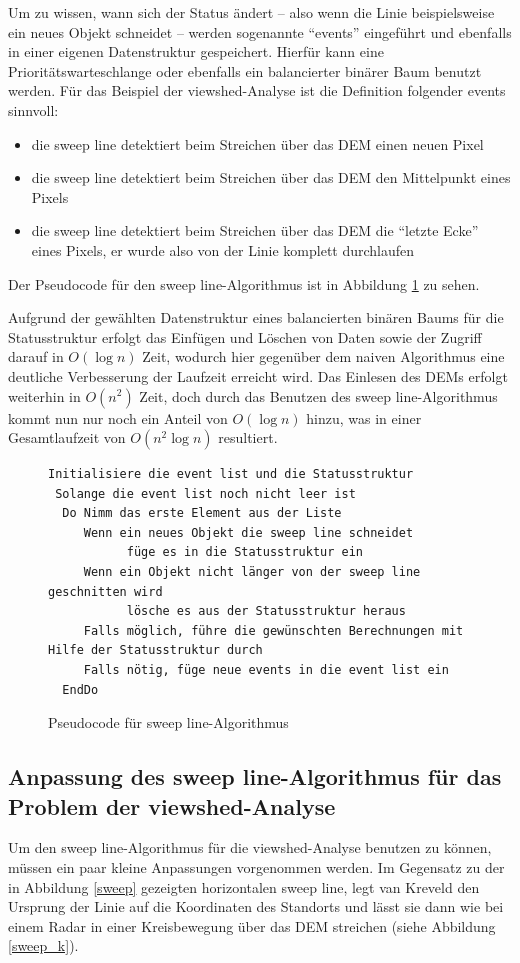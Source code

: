 Um zu wissen, wann sich der Status ändert -- also wenn die Linie beispielsweise ein neues Objekt schneidet -- werden sogenannte ``events'' eingeführt
und ebenfalls in einer eigenen Datenstruktur gespeichert. Hierfür kann eine Prioritätswarteschlange oder ebenfalls ein balancierter binärer Baum 
benutzt werden. Für das Beispiel der viewshed-Analyse ist die Definition folgender events sinnvoll: 
\begin{itemize}
 \item die sweep line detektiert beim Streichen über das DEM einen neuen Pixel
 \item die sweep line detektiert beim Streichen über das DEM den Mittelpunkt eines Pixels
 \item die sweep line detektiert beim Streichen über das DEM die ``letzte Ecke'' eines Pixels, er wurde also von der Linie komplett durchlaufen
\end{itemize}

Der Pseudocode für den sweep line-Algorithmus ist in Abbildung \ref{pseudo} zu sehen.
\vspace{5pt}

Aufgrund der gewählten Datenstruktur eines balancierten binären Baums für die Statusstruktur erfolgt das Einfügen und Löschen von Daten sowie der 
Zugriff darauf in $O(\log n)$ Zeit, wodurch hier gegenüber dem naiven Algorithmus eine deutliche Verbesserung der Laufzeit erreicht wird. Das 
Einlesen des DEMs erfolgt weiterhin in $O(n^2)$ Zeit, doch durch das Benutzen des sweep line-Algorithmus kommt nun nur noch ein Anteil von 
$O(\log n)$ hinzu, was in einer Gesamtlaufzeit von $O(n^2\log n)$ resultiert.

\begin{figure}[!ht]
 \centering
 \begin{BVerbatim}
Initialisiere die event list und die Statusstruktur
 Solange die event list noch nicht leer ist 
  Do Nimm das erste Element aus der Liste 
     Wenn ein neues Objekt die sweep line schneidet
	       füge es in die Statusstruktur ein
     Wenn ein Objekt nicht länger von der sweep line geschnitten wird
	       lösche es aus der Statusstruktur heraus
     Falls möglich, führe die gewünschten Berechnungen mit Hilfe der Statusstruktur durch      
     Falls nötig, füge neue events in die event list ein
  EndDo
\end{BVerbatim}
\caption{Pseudocode für sweep line-Algorithmus}
\label{pseudo}
\end{figure}

\subsection{Anpassung des sweep line-Algorithmus für das Problem der viewshed-Analyse}
\label{sweep_adjust}
Um den sweep line-Algorithmus für die viewshed-Analyse benutzen zu können, müssen ein paar kleine Anpassungen vorgenommen werden. Im Gegensatz zu 
der in Abbildung \ref{sweep} gezeigten horizontalen sweep line, legt van Kreveld den Ursprung der Linie auf die Koordinaten des Standorts und lässt 
sie dann wie bei einem Radar in einer Kreisbewegung über das DEM streichen (siehe Abbildung \ref{sweep_k}).

